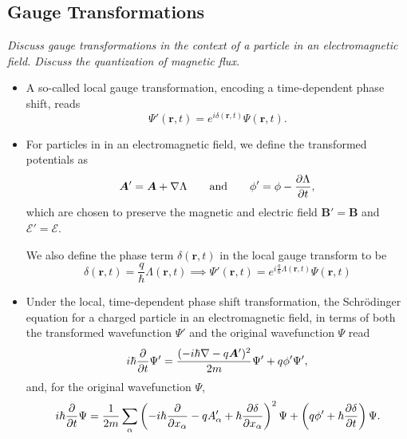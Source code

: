 \documentclass[11pt, a4paper]{article}
\renewcommand{\grad}{\nabla}
\newcommand{\eqtext}[1]{\qquad \text{#1} \qquad}
\newcommand{\Schro}{Schr\"{o}dinger\xspace}
\renewcommand{\vec}[1]{\bm{#1}}  %
\renewcommand{\r}{\vec{r}}  %
\newcommand{\A}{\vec{A}}  %
\newcommand{\B}{\vec{B}}  %
\renewcommand{\P}{\Psi}  %
\begin{document}
\subsection{Gauge Transformations}
\textit{Discuss gauge transformations in the context of a particle in an electromagnetic field. Discuss the quantization of magnetic flux.}

\begin{itemize}
    \item A so-called local gauge transformation, encoding a time-dependent phase shift, reads
	\begin{equation*}
		\P'(\r, t) = e^{i\delta (\r, t)} \P(\r, t).
	\end{equation*}

    \item For particles in in an electromagnetic field, we define the transformed potentials as
	\begin{equation*}
		\A' = \A + \grad \Lambda \eqtext{and} \phi' = \phi - \pdv{\Lambda}{t},
	\end{equation*}
	which are chosen to preserve the magnetic and electric field $ \B' = \B $ and $ \vec{\mathcal{E}}' = \vec{\mathcal{E}} $.

    We also define the phase term $ \delta(\r, t) $ in the local gauge transform to be
	\begin{equation*}
		\delta(\r, t) = \frac{q}{\hbar}\Lambda(\r, t) \implies \P'(\r, t) = e^{i\frac{q}{\hbar}\Lambda(\r, t)} \P(\r, t)
	\end{equation*}

    \item Under the local, time-dependent phase shift transformation, the \Schro equation for a charged particle in an electromagnetic field, in terms of both the transformed wavefunction $ \Psi' $ and the original wavefunction $ \Psi $ read
	\begin{equation*}
	    i\hbar \pdv{t}\P' = \frac{(-i\hbar \grad - q\A')^{2}}{2m} \P' + q \phi' \P',
	\end{equation*}
    and, for the original wavefunction $ \Psi $,
	\begin{equation*}
		i\hbar \pdv{t}\P = \frac{1}{2m}\sum_{\alpha}\left(-i\hbar \pdv{x_{\alpha}} - q A'_{\alpha} + \hbar \pdv{\delta}{x_{\alpha}}\right)^{2} \P + \left(q\phi' + \hbar \pdv{\delta}{t}\right)\P.
	\end{equation*}


\end{itemize}
\end{document}

